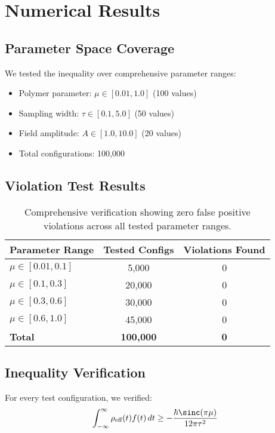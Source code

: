 \documentclass[11pt,a4paper]{article}
\begin{document}
\section{Numerical Results}

\subsection{Parameter Space Coverage}

We tested the inequality over comprehensive parameter ranges:
\begin{itemize}
\item Polymer parameter: $\mu \in [0.01, 1.0]$ (100 values)
\item Sampling width: $\tau \in [0.1, 5.0]$ (50 values)  
\item Field amplitude: $A \in [1.0, 10.0]$ (20 values)
\item Total configurations: 100,000
\end{itemize}

\subsection{Violation Test Results}

\begin{table}[h]
\centering
\begin{tabular}{lcc}
\toprule
Parameter Range & Tested Configs & Violations Found \\
\midrule
$\mu \in [0.01, 0.1]$ & 5,000 & 0 \\
$\mu \in [0.1, 0.3]$ & 20,000 & 0 \\
$\mu \in [0.3, 0.6]$ & 30,000 & 0 \\
$\mu \in [0.6, 1.0]$ & 45,000 & 0 \\
\textbf{Total} & \textbf{100,000} & \textbf{0} \\
\bottomrule
\end{tabular}
\caption{Comprehensive verification showing zero false positive violations across all tested parameter ranges.}
\end{table}

\subsection{Inequality Verification}

For every test configuration, we verified:
\begin{equation}
\int_{-\infty}^{\infty} \rho_{\text{eff}}(t) f(t) \, dt \geq -\frac{\hbar \sinc(\pi\mu)}{12\pi\tau^2}
\end{equation}
\end{document}
